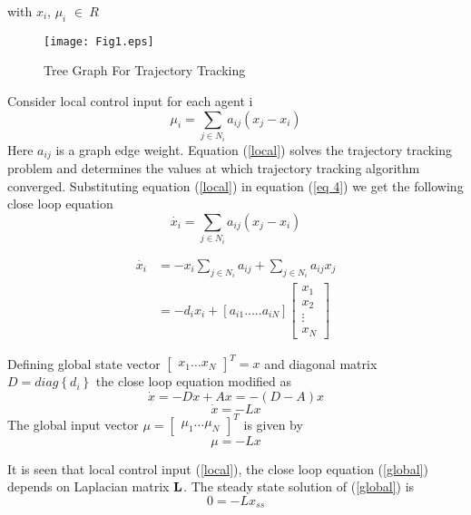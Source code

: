 \documentclass[twocolumn]{IETEJR}
\begin{document}
with $x_{i}$, $\mu_{i}$ $\in \ R$	
\begin{center}
	\begin{figure}[h]
		\texttt{[image: Fig1.eps]}
		\caption{Tree Graph For Trajectory Tracking}
		\label{graph}
	\end{figure}
\end{center}
Consider local control input for each agent i 
\begin{equation}
\mu_{i}=\sum_{j \in N_{i}}a_{ij}(x_{j}-x_{i}) \label{local}
\end{equation}
Here $a_{ij}$ is a graph edge weight. Equation (\ref{local}) solves the trajectory tracking problem and determines the values at which trajectory tracking algorithm converged. Substituting equation (\ref{local}) in equation (\ref{eq 4}) we get the following close loop equation 
\begin{equation}
\dot{x_{i}}=\sum_{j \in N_{i}}a_{ij}(x_{j}-x_{i})
\end{equation}

\begin{align}
\dot{x_{i}}&=-x_{i}\sum_{j \in N_{i}}a_{ij}+\sum_{j \in N_{i}}a_{ij}x_{j}\\
&=-d_{i}x_{i}+\left[a_{i1} ..... a_{iN} \right]\begin{bmatrix}
x_{1} \\
x_{2} \\
\vdots \\
x_{N}
\end{bmatrix}  
\end{align}

Defining global state vector $ \begin{bmatrix}
x_{1} \hdots x_{N}
\end{bmatrix}^{T}=x$ and diagonal matrix  $D=diag\left\lbrace d_{i}\right\rbrace $ the close loop equation modified as   
\begin{equation}
\dot{x}=-Dx+Ax=-(D-A)x
\end{equation}  
\begin{equation}
\dot{x}=-Lx \label{global}  
\end{equation}
The global input vector $\mu=\begin{bmatrix}
\mu_{1} \hdots \mu_{N}
\end{bmatrix}^{T}$ is given by 
\begin{equation}
\mu=-Lx
\end{equation} 

It is seen that local control input (\ref{local}), the close loop equation (\ref{global}) depends on Laplacian matrix $\bf{L}$. The steady state solution of (\ref{global}) is 
\begin{equation}
0=-Lx_{ss}
\end{equation} 
\end{document}
